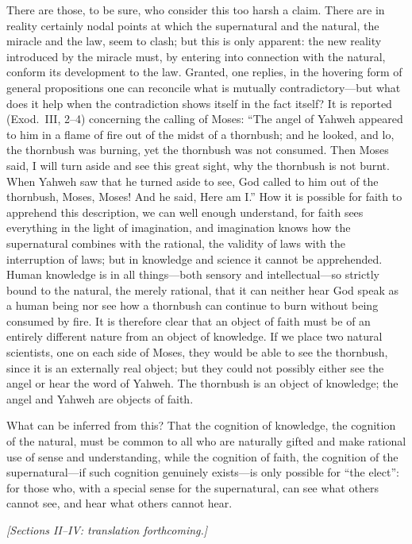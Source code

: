 \documentclass[12pt,a4paper]{article}
\begin{document}
There are those, to be sure, who consider this too harsh a claim. There
are in reality certainly nodal points at which the supernatural and the
natural, the miracle and the law, seem to clash; but this is only
apparent: the new reality introduced by the miracle must, by entering
into connection with the natural, conform its development to the law.
Granted, one replies, in the hovering form of general propositions one
can reconcile what is mutually contradictory---but what does it help
when the contradiction shows itself in the fact itself? It is reported
(Exod.\ III, 2--4) concerning the calling of Moses: ``The angel of
Yahweh appeared to him in a flame of fire out of the midst of a
thornbush; and he looked, and lo, the thornbush was burning, yet the
thornbush was not consumed. Then Moses said, I will turn aside and see
this great sight, why the thornbush is not burnt. When Yahweh saw that
he turned aside to see, God called to him out of the thornbush, Moses,
Moses! And he said, Here am I.'' How it is possible for faith to
apprehend this description, we can well enough understand, for faith
sees everything in the light of imagination, and imagination knows how
the supernatural combines with the rational, the validity of laws with
the interruption of laws; but in knowledge and science it cannot be
apprehended. Human knowledge is in all things---both sensory and
intellectual---so strictly bound to the natural, the merely rational,
that it can neither hear God speak as a human being nor see how a
thornbush can continue to burn without being consumed by fire. It is
therefore clear that an object of faith must be of an entirely different
nature from an object of knowledge. If we place two natural scientists,
one on each side of Moses, they would be able to see the thornbush,
since it is an externally real object; but they could not possibly
either see the angel or hear the word of Yahweh. The thornbush is an
object of knowledge; the angel and Yahweh are objects of faith.

What can be inferred from this? That the cognition of knowledge, the
cognition of the natural, must be common to all who are naturally
gifted and make rational use of sense and understanding, while the
cognition of faith, the cognition of the supernatural---if such
cognition genuinely exists---is only possible for ``the elect'': for
those who, with a special sense for the supernatural, can see what
others cannot see, and hear what others cannot hear.


\bigskip
\noindent\textit{[Sections II--IV: translation forthcoming.]}
\end{document}
